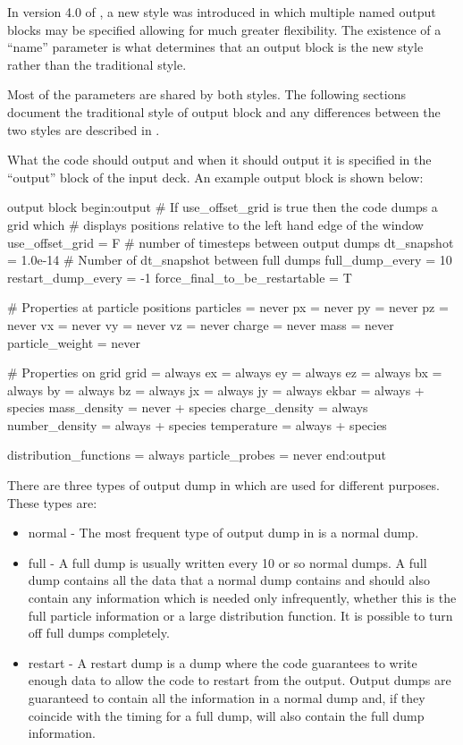 In version 4.0 of {\EPOCH}, a new style was introduced in which multiple
named output blocks may be specified allowing for much greater flexibility.
The existence of a ``name'' parameter is what determines that an output block
is the new style rather than the traditional style.

Most of the parameters are shared by both styles. The following sections
document the traditional style of output block and any differences between
the two styles are described in .

What the code should output and when it should output it is
specified in the ``output'' block of the input deck.
An example output block is shown below:
\begin{lboxverbatim}{output block}
begin:output
   # If use_offset_grid is true then the code dumps a grid which
   # displays positions relative to the left hand edge of the window
   use_offset_grid = F
   # number of timesteps between output dumps
   dt_snapshot = 1.0e-14
   # Number of dt_snapshot between full dumps
   full_dump_every = 10
   restart_dump_every = -1
   force_final_to_be_restartable = T

   # Properties at particle positions
   particles = never
   px = never
   py = never
   pz = never
   vx = never
   vy = never
   vz = never
   charge = never
   mass = never
   particle_weight = never

   # Properties on grid
   grid = always
   ex = always
   ey = always
   ez = always
   bx = always
   by = always
   bz = always
   jx = always
   jy = always
   ekbar = always + species
   mass_density = never + species
   charge_density = always
   number_density = always + species
   temperature = always + species

   distribution_functions = always
   particle_probes = never
end:output
\end{lboxverbatim}

There are three types of output dump in {\EPOCH} which are used for different
purposes. These types are:

\begin{itemize}
\item normal - The most frequent type of output dump in {\EPOCH} is a
  normal dump.
\item full - A full dump is usually written every 10 or so normal dumps. A
  full dump contains all the data that a normal dump contains and should also
  contain any information which is needed only infrequently, whether this is
  the full particle information or a large distribution function. It is
  possible to turn off full dumps completely.
\item restart - A restart dump is a dump where the code guarantees to
  write enough data to allow the code to restart from the output. Output dumps
  are guaranteed to contain all the information in a normal dump and, if they
  coincide with the timing for a full dump, will also contain the full dump
  information.
\end{itemize}

